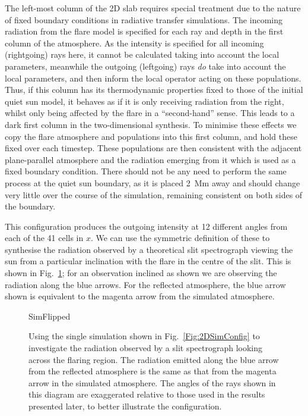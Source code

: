 The left-most column of the 2D slab requires special treatment due to the nature of fixed boundary conditions in radiative transfer simulations.
The incoming radiation from the flare model is specified for each ray and depth in the first column of the atmosphere.
As the intensity is specified for all incoming (rightgoing) rays here, it cannot be calculated taking into account the local parameters, meanwhile the outgoing (leftgoing) rays \emph{do} take into account the local parameters, and then inform the local operator acting on these populations.
Thus, if this column has its thermodynamic properties fixed to those of the initial quiet sun model, it behaves as if it is only receiving radiation from the right, whilst only being affected by the flare in a ``second-hand'' sense.
This leads to a dark first column in the two-dimensional synthesis.
To minimise these effects we copy the flare atmosphere and populations into this first column, and hold these fixed over each timestep.
These populations are then consistent with the adjacent plane-parallel atmosphere and the radiation emerging from it which is used as a fixed boundary condition.
There should not be any need to perform the same process at the quiet sun boundary, as it is placed \SI{2}{\mega\metre} away and should change very little over the course of the simulation, remaining consistent on both sides of the boundary.

This configuration produces the outgoing intensity at 12 different angles from each of the 41 cells in $x$.
We can use the symmetric definition of these to synthesise the radiation observed by a theoretical slit spectrograph viewing the sun from a particular inclination with the flare in the centre of the slit.
This is shown in Fig.~\ref{Fig:2DSimFlipped}; for an observation inclined as shown we are observing the radiation along the blue arrows.
For the reflected atmosphere, the blue arrow shown is equivalent to the magenta arrow from the simulated atmosphere.

\begin{figure}[htb]
\centering
{SimFlipped}
\caption[Configuration of two-dimensional simulation to produce radiation that would be observed by a slit spectrograph looking across the model flare.]{Using the single simulation shown in Fig.~\ref{Fig:2DSimConfig} to investigate the radiation observed by a slit spectrograph looking across the flaring region. The radiation emitted along the {\color{TolBlue}blue} arrow from the reflected atmosphere is the same as that from the {\color{TolMagenta}magenta} arrow in the simulated atmosphere. The angles of the rays shown in this diagram are exaggerated relative to those used in the results presented later, to better illustrate the configuration.}
\label{Fig:2DSimFlipped}
\end{figure}

